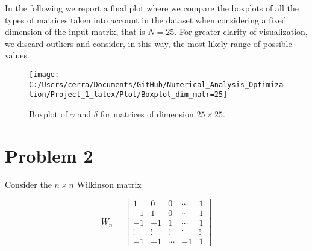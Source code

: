 \documentclass[a4paper,11pt]{article}
\begin{document}
\noindent In the following we report a final plot where we compare the boxplots of all the types of matrices taken into account in the dataset when considering a fixed dimension of the input matrix, that is $N=25$. For greater clarity of visualization, we discard outliers and consider, in this way, the most likely range of possible values.

\begin{figure}[H]
	\centering
	\texttt{[image: C:/Users/cerra/Documents/GitHub/Numerical\_Analysis\_Optimization/Project\_1\_latex/Plot/Boxplot\_dim\_matr=25]}
	\caption{Boxplot of $\gamma$ and $\delta$ for matrices of dimension $25\times25$.}
	\label{fig:Boxplot_final}
\end{figure}

	
\section{Problem 2}
Consider the $n \times n$ Wilkinson matrix

\begin{equation}\label{key}
	W_n = 
	\begin{bmatrix}
		1 & 0  & 0  & \cdots  & 1  \\
		-1 & 1 & 0 & \cdots & 1 \\
		-1 & -1 & 1 & \cdots & 1 \\
		\vdots & \vdots & \vdots & \ddots & \vdots \\
		-1 & -1 & \cdots & -1 & 1 
	\end{bmatrix}
\end{equation}
\end{document}
